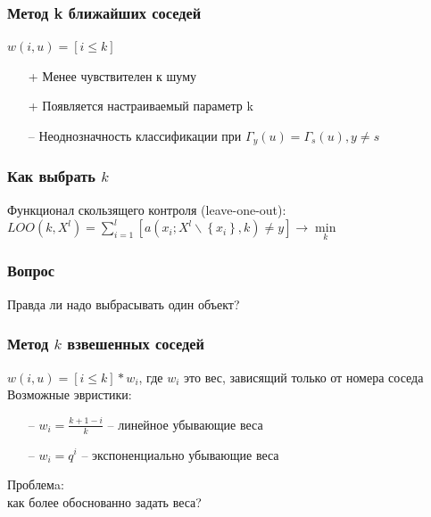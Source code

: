 \documentclass[12pt]{beamer}
\begin{document}
\begin{frame}\frametitle{Метод k ближайших соседей}
${w(i, u) = [i \leq k]}$\\
\vspace{5mm}
\begin{itemize}
	\item[+] Менее чувствителен к шуму
	\item[+] Появляется настраиваемый параметр k
\end{itemize}
\begin{itemize}
\item[--] Неоднозначность классификации при ${\Gamma_y(u) = \Gamma_s(u), y \neq s}$
\end{itemize}

\end{frame}
\begin{frame}\frametitle{Как выбрать $k$}
Функционал скользящего контроля (leave-one-out):\\
${LOO(k, X^l) = \sum\limits_{i=1}^l [a(x_i; X^l \backslash \left\{x_i\right\}, k) \neq y] \rightarrow \min\limits_k}$\\
\vspace{5mm}

\end{frame}

\begin{frame}\frametitle{Вопрос}
Правда ли надо выбрасывать один объект?
\end{frame}


\begin{frame}\frametitle{Метод $k$ взвешенных соседей}
${w(i,u) = [i \leq k] * w_i}$, где $w_i$ это вес, зависящий только от номера соседа\\
\vspace{5mm}
Возможные эвристики:\\
\begin{itemize}
\item[--] ${w_i = \frac{k+1-i}{k}}$ -- линейное убывающие веса\\ %
\item[--] ${w_i = q^i}$ -- экспоненциально убывающие веса\\

\end{itemize}
\vspace{5mm}
Проблемa:\\
как более обоснованно задать веса?\\
\end{frame}
\end{document}
